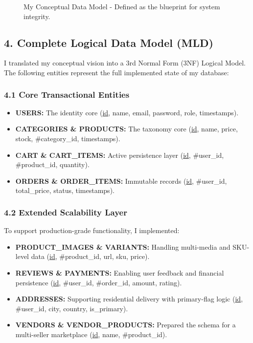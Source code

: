 \documentclass[12pt,a4paper]{article}
\begin{document}
\begin{figure}[H]
    \centering
    \caption{My Conceptual Data Model - Defined as the blueprint for system integrity.}
\end{figure}

\subsection{4. Complete Logical Data Model (MLD)}
I translated my conceptual vision into a 3rd Normal Form (3NF) Logical Model. The following entities represent the full implemented state of my database:

\subsubsection{4.1 Core Transactional Entities}
\begin{itemize}[noitemsep]
    \item \textbf{USERS:} The identity core (\underline{id}, name, email, password, role, timestamps).
    \item \textbf{CATEGORIES \& PRODUCTS:} The taxonomy core (\underline{id}, name, price, stock, \#category\_id, timestamps).
    \item \textbf{CART \& CART\_ITEMS:} Active persistence layer (\underline{id}, \#user\_id, \#product\_id, quantity).
    \item \textbf{ORDERS \& ORDER\_ITEMS:} Immutable records (\underline{id}, \#user\_id, total\_price, status, timestamps).
\end{itemize}

\subsubsection{4.2 Extended Scalability Layer}
To support production-grade functionality, I implemented:
\begin{itemize}[noitemsep]
    \item \textbf{PRODUCT\_IMAGES \& VARIANTS:} Handling multi-media and SKU-level data (\underline{id}, \#product\_id, url, sku, price).
    \item \textbf{REVIEWS \& PAYMENTS:} Enabling user feedback and financial persistence (\underline{id}, \#user\_id, \#order\_id, amount, rating).
    \item \textbf{ADDRESSES:} Supporting residential delivery with primary-flag logic (\underline{id}, \#user\_id, city, country, is\_primary).
    \item \textbf{VENDORS \& VENDOR\_PRODUCTS:} Prepared the schema for a multi-seller marketplace (\underline{id}, name, \#product\_id).
\end{itemize}
\end{document}
